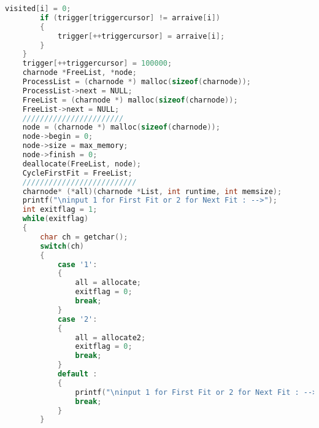 \documentclass[UTF8]{ctexart}
\begin{document}
\begin{lstlisting}[language = C]
        visited[i] = 0;
        if (trigger[triggercursor] != arraive[i])
        {
            trigger[++triggercursor] = arraive[i];
        }
    }
    trigger[++triggercursor] = 100000;
    charnode *FreeList, *node;
    ProcessList = (charnode *) malloc(sizeof(charnode));
    ProcessList->next = NULL;
    FreeList = (charnode *) malloc(sizeof(charnode));
    FreeList->next = NULL;
    ///////////////////////
    node = (charnode *) malloc(sizeof(charnode));
    node->begin = 0;
    node->size = max_memory;
    node->finish = 0;
    deallocate(FreeList, node);
    CycleFirstFit = FreeList;
    //////////////////////////
    charnode* (*all)(charnode *List, int runtime, int memsize);
    printf("\ninput 1 for First Fit or 2 for Next Fit : -->");
    int exitflag = 1;    
    while(exitflag)
    {
        char ch = getchar();
        switch(ch)
        {
            case '1': 
            {
                all = allocate;
                exitflag = 0;
                break;
            }
            case '2': 
            {
                all = allocate2;
                exitflag = 0;
                break;
            }
            default : 
            {
                printf("\ninput 1 for First Fit or 2 for Next Fit : -->");
                break;
            }
        }
        

\end{lstlisting}
\end{document}
